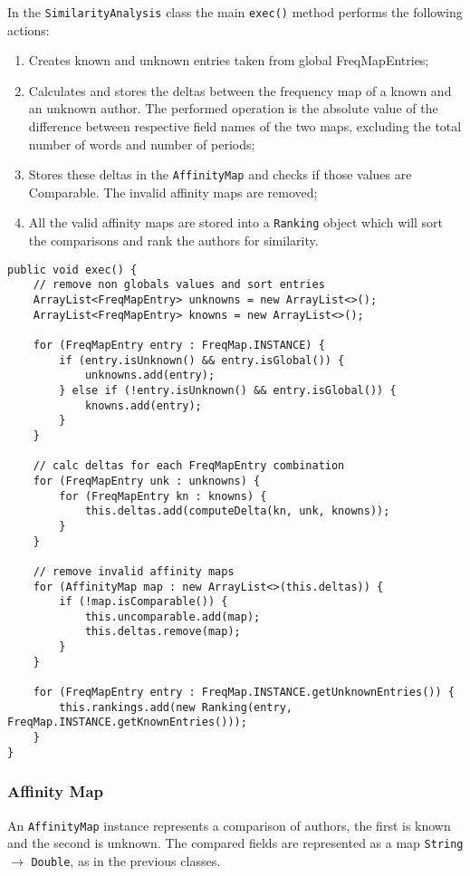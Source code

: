 \documentclass[a4paper,11pt, twoside]{article}
\begin{document}
		\noindent
		In the \lstinline|SimilarityAnalysis| class the main \lstinline|exec()| method performs the following actions:
		\begin{enumerate}
			\item Creates known and unknown entries taken from global FreqMapEntries;
			\item Calculates and stores the deltas between the frequency map of a known and an unknown author. The performed operation is the absolute value of the difference between respective field names of the two maps, excluding the total number of words and number of periods;
			\item Stores these deltas in the \lstinline|AffinityMap| and checks if those values are Comparable. The invalid affinity maps are removed;
			\item All the valid affinity maps are stored into a \lstinline|Ranking| object which will sort the comparisons and rank the authors for similarity.
		\end{enumerate}
		\begin{lstlisting}[firstnumber=35,caption={SimilarityAnalysis exec method}, captionpos=b, label={lst:execmethod}]
public void exec() {
	// remove non globals values and sort entries
	ArrayList<FreqMapEntry> unknowns = new ArrayList<>();
	ArrayList<FreqMapEntry> knowns = new ArrayList<>();

	for (FreqMapEntry entry : FreqMap.INSTANCE) {
		if (entry.isUnknown() && entry.isGlobal()) {
			unknowns.add(entry);
		} else if (!entry.isUnknown() && entry.isGlobal()) {
			knowns.add(entry);
		}
	}

	// calc deltas for each FreqMapEntry combination
	for (FreqMapEntry unk : unknowns) {
		for (FreqMapEntry kn : knowns) {
			this.deltas.add(computeDelta(kn, unk, knowns));
		}
	}

	// remove invalid affinity maps
	for (AffinityMap map : new ArrayList<>(this.deltas)) {
		if (!map.isComparable()) {
			this.uncomparable.add(map);
			this.deltas.remove(map);
		}
	}

	for (FreqMapEntry entry : FreqMap.INSTANCE.getUnknownEntries()) {
		this.rankings.add(new Ranking(entry, FreqMap.INSTANCE.getKnownEntries()));
	}
}
		\end{lstlisting}

		\subsubsection{Affinity Map}
		\noindent
		An \lstinline|AffinityMap| instance represents a comparison of authors, the first is known and the second is unknown. The compared fields are represented as a map \lstinline|String| $\to$ \lstinline|Double|, as in the previous classes. 
		
\end{document}
